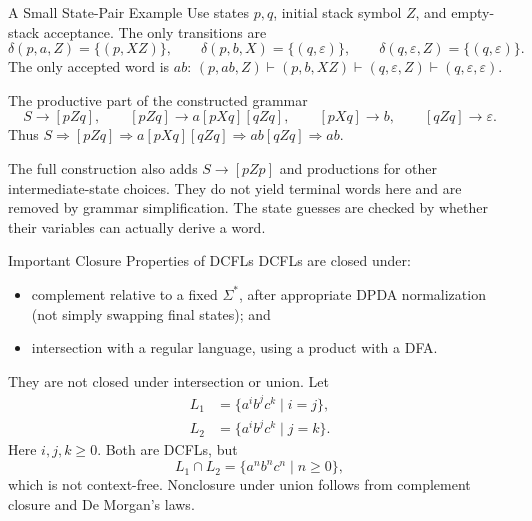 \documentclass[10pt]{beamer}
\begin{document}
\begin{frame}{A Small State-Pair Example}
  \small
  Use states $p,q$, initial stack symbol $Z$, and empty-stack acceptance.
  The only transitions are
  \[
    \delta(p,a,Z)=\{(p,XZ)\},\qquad
    \delta(p,b,X)=\{(q,\varepsilon)\},\qquad
    \delta(q,\varepsilon,Z)=\{(q,\varepsilon)\}.
  \]
  The only accepted word is $ab$:
  $(p,ab,Z)\vdash(p,b,XZ)\vdash(q,\varepsilon,Z)
    \vdash(q,\varepsilon,\varepsilon)$.
  \pause
  \begin{block}{The productive part of the constructed grammar}
    \[
      S\to[pZq],\qquad
      [pZq]\to a[pXq][qZq],\qquad
      [pXq]\to b,\qquad [qZq]\to\varepsilon.
    \]
    Thus $S\Rightarrow[pZq]\Rightarrow a[pXq][qZq]
      \Rightarrow ab[qZq]\Rightarrow ab$.
  \end{block}
  \pause
  The full construction also adds $S\to[pZp]$ and productions for other
  intermediate-state choices. They do not yield terminal words here and
  are removed by grammar simplification. The state guesses are checked
  by whether their variables can actually derive a word.
\end{frame}

\begin{frame}{Important Closure Properties of DCFLs}
  DCFLs are closed under:
  \begin{itemize}
    \item complement relative to a fixed $\Sigma^*$, after appropriate
      DPDA normalization (not simply swapping final states); and
    \item intersection with a regular language, using a product with a DFA.
  \end{itemize}
  \pause
  They are not closed under intersection or union. Let
  \begin{align*}
    L_1&=\{a^i b^j c^k\mid i=j\},\\
    L_2&=\{a^i b^j c^k\mid j=k\}.
  \end{align*}
  Here $i,j,k\ge0$.
  Both are DCFLs, but
  \[
    L_1\cap L_2=\{a^n b^n c^n\mid n\ge0\},
  \]
  which is not context-free. Nonclosure under union follows from complement closure and De Morgan's laws.
\end{frame}
\end{document}
